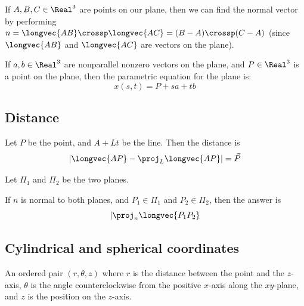\begin{procedure}
  If $A, B, C \in \Real^3$ are points on our plane, then we can find the normal vector by performing $n = \longvec{AB} \crossp \longvec{AC} = (B - A) \crossp (C - A)$ (since $\longvec{AB}$ and $\longvec{AC}$ are vectors on the plane).
\end{procedure}

\begin{theorem}
  If $a, b \in \Real^3$ are nonparallel nonzero vectors on the plane, and $P \in \Real^3$ is a point on the plane, then the parametric equation for the plane is:
  \[
    x(s, t) = P + sa + tb
  \]
\end{theorem}

\subsection{Distance}


\begin{procedure}
  Let $P$ be the point, and $A + Lt$ be the line. Then the distance is
  \[
    |\longvec{AP} - \proj_L \longvec{AP}| = \vec{P}
  \]
\end{procedure}

\begin{procedure}
  Let $\Pi_1$ and $\Pi_2$ be the two planes.

  If $n$ is normal to both planes, and $P_1 \in \Pi_1$ and $P_2 \in \Pi_2$, then the answer is
  \[
    |\proj_n \longvec{P_1 P_2}
  \]
\end{procedure}

\subsection{Cylindrical and spherical coordinates}


\begin{definition}
  An ordered pair $(r, \theta, z)$ where $r$ is the distance between the point and the $z$-axis, $\theta$ is the angle counterclockwise from the positive $x$-axis along the $xy$-plane, and $z$ is the position on the $z$-axis.
\end{definition}


